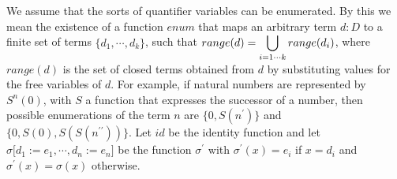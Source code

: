 \documentclass{article}
\begin{document}
We assume that the sorts of quantifier variables can be enumerated. By this
we mean the existence of a function $enum$ that maps an arbitrary term $d:D$
to a finite set of terms $\{d_{1},\cdots ,d_{k}\}$, such that $%
range(d)=\dbigcup\limits_{i=1\cdots k}range(d_{i})$, where $range(d)$ is the
set of closed terms obtained from $d$ by substituting values for the free
variables of $d$. For example, if natural numbers are represented by $%
S^{n}(0)$, with $S$ a function that expresses the successor of a number,
then possible enumerations of the term $n$ are $\{0,S(n^{\prime })\}$ and $%
\{0,S(0),S(S(n^{\prime \prime }))\}$. Let $id$ be the identity function and
let $\sigma \lbrack d_{1}:=e_{1},\cdots ,d_{n}:=e_{n}]$ be the function $%
\sigma ^{\prime }$ with $\sigma ^{\prime }(x)=e_{i}$ if $x=d_{i}$ and $%
\sigma ^{\prime }(x)=\sigma (x)$ otherwise.
\end{document}
